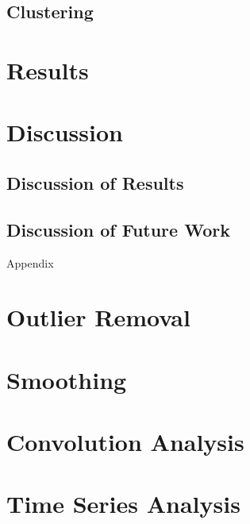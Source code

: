 \documentclass[11pt]{article}
\begin{document}
		

	\subsection{Clustering}
	
		
		
\section{Results} \label{results}
		
	

\section{Discussion} \label{discussion}
	
	\subsection{Discussion of Results}
		
		
		
	\subsection{Discussion of Future Work}
	
		

\pagebreak

		

\pagebreak

\begin{center}
\Huge{Appendix} \appendix
\end{center}


\section{Outlier Removal} \label{app_outliers}



\section{Smoothing} \label{app_smoothing}



\section{Convolution Analysis} \label{app_convolution}



\section{Time Series Analysis} \label{app_time}




		




\end{document}

